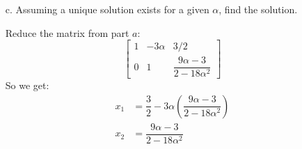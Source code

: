 \documentclass{article}
\begin{document}
\begin{itemize}
        \item [c.] Assuming a unique solution exists for a given $\alpha$, find the solution.
            \begin{answer}
                Reduce the matrix from part $a$:
                    \begin{equation*}
                        \begin{bmatrix}
                            1 & -3\alpha & 3/2                                   \\
                            0 & 1        & \dfrac{9\alpha - 3}{2 - 18\alpha^{2}}   
                        \end{bmatrix}
                    \end{equation*}
                So we get:
                    \begin{align*}
                        x_{1} &= \dfrac{3}{2} - 3\alpha\left(\dfrac{9\alpha - 3}{2 - 18\alpha^{2}}\right) \\
                        x_{2} &= \dfrac{9\alpha - 3}{2 - 18\alpha^{2}}                                      
                    \end{align*}
            \end{answer}
    \end{itemize}
\end{document}
